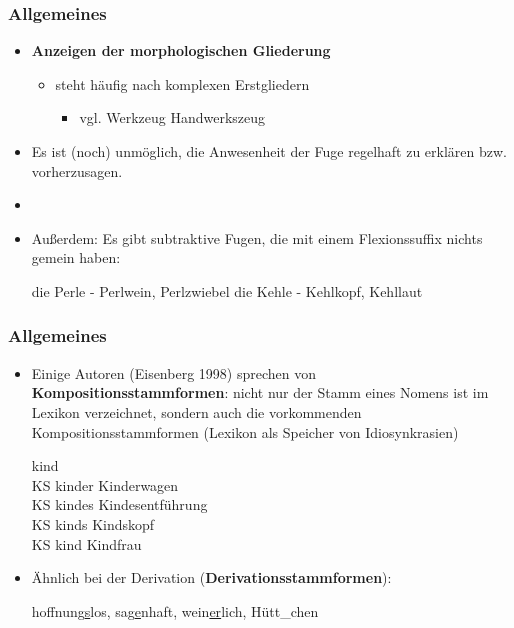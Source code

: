 \begin{frame}
\frametitle{Allgemeines}

\begin{itemize}
	\item \textbf{Anzeigen der morphologischen Gliederung}
	
	\begin{itemize}
		\item {} steht häufig nach komplexen Erstgliedern
		
		\begin{itemize}
			\item vgl. Werkzeug \vs Handwerkszeug
		\end{itemize}
	\end{itemize}
	
	\item Es ist (noch) unmöglich, die Anwesenheit der Fuge regelhaft zu erklären bzw. vorherzusagen.
	\item []
	\item Außerdem: Es gibt subtraktive Fugen, die mit einem Flexionssuffix nichts gemein haben:
	
	\eal 
		\ex die Perle - Perlwein, Perlzwiebel
		\ex die Kehle - Kehlkopf, Kehllaut
	\zl
		 
\end{itemize}


\end{frame}


\begin{frame}
\frametitle{Allgemeines}

\begin{itemize}
	\item Einige Autoren (\zB Eisenberg 1998) sprechen von \textbf{Kompositionsstammformen}: nicht nur der Stamm eines Nomens ist im Lexikon verzeichnet, sondern auch die vorkommenden Kompositionsstammformen (Lexikon als Speicher von Idiosynkrasien)
	
	\ea 
		kind \\
		  KS kinder \zB Kinderwagen \\
		  KS kindes \zB Kindesentführung \\
		  KS kinds \zB Kindskopf \\
		  KS kind \zB Kindfrau \\
	\z
		  
	\item Ähnlich bei der Derivation (\textbf{Derivationsstammformen}):
	
	\ea hoffnung\underline{s}los, sag\underline{e}nhaft, wein\underline{er}lich, Hütt\_chen
	\z
	
\end{itemize}


\end{frame}


